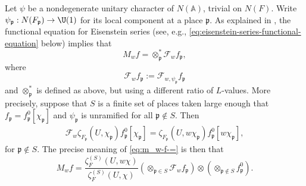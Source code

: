 Let $\psi$ be a nondegenerate unitary character of $N(\mathbb{A})$, trivial on $N(F)$.  Write $\psi_\mathfrak{p} : N(F_\mathfrak{p}) \rightarrow \U(1)$ for its local component at a place $\mathfrak{p}$.  As explained in \cite[\S4]{MR610479}, the functional equation for Eisenstein series (see, e.g., \eqref{eq:eisenstein-series-functional-equation} below) implies that
\begin{equation}\label{eq:m_w-f-=}
  M_w f = \otimes_{\mathfrak{p}}^* \mathcal{F}_{w} f_\mathfrak{p},
\end{equation}
where
\begin{equation*}
  \mathcal{F}_{w} f_\mathfrak{p} := \mathcal{F}_{w,\psi_\mathfrak{p}} f_\mathfrak{p}
\end{equation*}
and $\otimes^*_{\mathfrak{p}}$ is defined as above, but using a different ratio of $L$-values.  More precisely, suppose that $S$ is a finite set of places taken large enough that $f_\mathfrak{p} = f_\mathfrak{p}^0[\chi_\mathfrak{p}]$ and $\psi_\mathfrak{p}$ is unramified for all $\mathfrak{p} \notin S$.  Then
\begin{align*}
  \mathcal{F}_{w} \zeta_{F_\mathfrak{p}}(U, \chi_\mathfrak{p}) f_\mathfrak{p}^0[\chi_\mathfrak{p}] =
  \zeta_{F_\mathfrak{p}}(U,w \chi_\mathfrak{p})f_\mathfrak{p}^0[w \chi_\mathfrak{p}],
\end{align*}
for $\mathfrak{p} \notin S$.  The precise meaning of \eqref{eq:m_w-f-=} is then that
\begin{equation}\label{eq:m_w-f-=-1}
  M_w f
  =
  \frac{
    \zeta_F^{(S)}(U,w \chi)
  }{
    \zeta_F^{(S)}(U,\chi)
  }
  (\otimes_{\mathfrak{p} \in S}
  \mathcal{F}_w f_\mathfrak{p} ) \otimes (
  \otimes_{\mathfrak{p} \notin S} f_\mathfrak{p}^0).
\end{equation}

